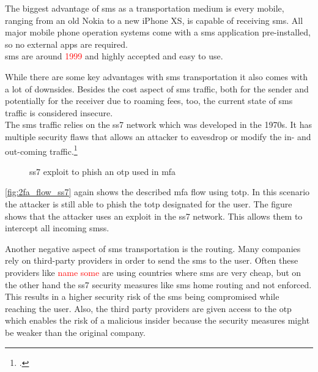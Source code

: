 The biggest advantage of \gls{sms} as a transportation medium is every mobile, ranging from an old Nokia to a new iPhone XS, is capable of receiving \gls{sms}. All major mobile phone operation systems come with a \gls{sms} application pre-installed, so no external apps are required.\\
\gls{sms} are around \textcolor{red}{1999} and highly accepted and easy to use.

\newpage

While there are some key advantages with \gls{sms} transportation it also comes with a lot of downsides. Besides the cost aspect of \gls{sms} traffic, both for the sender and potentially for the receiver due to roaming fees, too, the current state of \gls{sms} traffic is considered insecure.\\
The \gls{sms} traffic relies on the \gls{ss7} network which was developed in the 1970s. It has multiple security flaws that allows an attacker to eavesdrop or modify the in- and out-coming traffic.\footcite{WELCH201717,7997246,puzankov2017stealthy}

\begin{figure}[hbt]
	\centering
	
	\caption[\gls{ss7} exploit to phish an \gls{otp} used in \gls{mfa}]{\gls{ss7} exploit to phish an \gls{otp} used in \gls{mfa}\footnotemark}
	\label{fig:2fa_flow_ss7}
\end{figure}

\autoref{fig:2fa_flow_ss7} again shows the described \gls{mfa} flow using \gls{totp}. In this scenario the attacker is still able to phish the \gls{totp} designated for the user. The figure shows that the attacker uses an exploit in the \gls{ss7} network. This allows them to intercept all incoming \glspl{sms}.

\newpage

Another negative aspect of \gls{sms} transportation is the routing. Many companies rely on third-party providers in order to send the \gls{sms} to the user. Often these providers like \textcolor{red}{name some} are using countries where \gls{sms} are very cheap, but on the other hand the \gls{ss7} security measures like \gls{sms} home routing and not enforced. This results in a higher security risk of the \gls{sms} being compromised while reaching the user. Also, the third party providers are given access to the \gls{otp} which enables the risk of a malicious insider because the security measures might be weaker than the original company.

